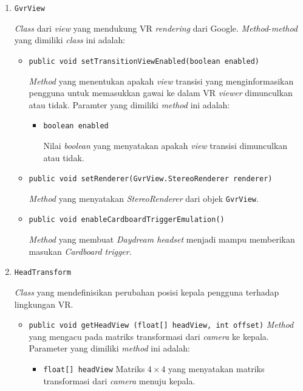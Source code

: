 \begin{enumerate}
		\item \texttt{GvrView}
		
		\textit{Class} dari \textit{view} yang mendukung VR \textit{rendering} dari Google. \textit{Method}-\textit{method} yang dimiliki \textit{class} ini adalah:
		
		\begin{itemize}			
			\item \texttt{public void  setTransitionViewEnabled(boolean enabled)}
			
			\textit{Method} yang menentukan apakah \textit{view} transisi yang menginformasikan pengguna untuk memasukkan gawai ke dalam VR \textit{viewer} dimunculkan atau tidak. Paramter yang dimiliki \textit{method} ini adalah:
			
			\begin{itemize}
				\item \texttt{boolean enabled}
				
				Nilai \textit{boolean} yang menyatakan apakah \textit{view} transisi dimunculkan atau tidak. 
			\end{itemize}
			
			\item \texttt{public void setRenderer(GvrView.StereoRenderer renderer)}
			
			\textit{Method} yang menyatakan \textit{StereoRenderer} dari objek \texttt{GvrView}.
			
			\item \texttt{public void enableCardboardTriggerEmulation()}
			
			\textit{Method} yang membuat \textit{Daydream headset} menjadi mampu memberikan masukan \textit{Cardboard trigger}.
			
		\end{itemize}
			
		\item \texttt{HeadTransform}
		
		\textit{Class} yang mendefinisikan perubahan posisi kepala pengguna terhadap lingkungan VR.
		
		\begin{itemize}
			\item \texttt{public void getHeadView (float[] headView, int offset)}
			\textit{Method} yang mengacu pada matriks transformasi dari \textit{camera} ke kepala. Parameter yang dimiliki \textit{method} ini adalah:			
			
			\begin{itemize}
				\item \texttt{float[] headView}
				Matriks $4\times4$ yang menyatakan matriks transformasi dari \textit{camera} menuju kepala. 
				

\end{itemize}
\end{itemize}
\end{enumerate}
